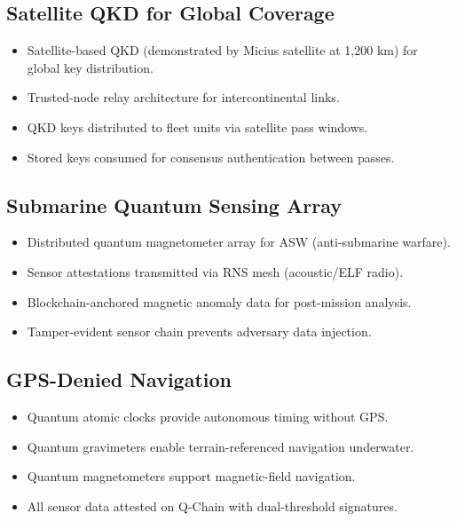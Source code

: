 \documentclass[11pt,letterpaper]{article}
\begin{document}
\subsection{Satellite QKD for Global Coverage}

\begin{itemize}
\item Satellite-based QKD (demonstrated by Micius satellite at 1,200 km) for global key distribution.
\item Trusted-node relay architecture for intercontinental links.
\item QKD keys distributed to fleet units via satellite pass windows.
\item Stored keys consumed for consensus authentication between passes.
\end{itemize}

\subsection{Submarine Quantum Sensing Array}

\begin{itemize}
\item Distributed quantum magnetometer array for ASW (anti-submarine warfare).
\item Sensor attestations transmitted via RNS mesh (acoustic/ELF radio).
\item Blockchain-anchored magnetic anomaly data for post-mission analysis.
\item Tamper-evident sensor chain prevents adversary data injection.
\end{itemize}

\subsection{GPS-Denied Navigation}

\begin{itemize}
\item Quantum atomic clocks provide autonomous timing without GPS.
\item Quantum gravimeters enable terrain-referenced navigation underwater.
\item Quantum magnetometers support magnetic-field navigation.
\item All sensor data attested on Q-Chain with dual-threshold signatures.
\end{itemize}

\end{document}

